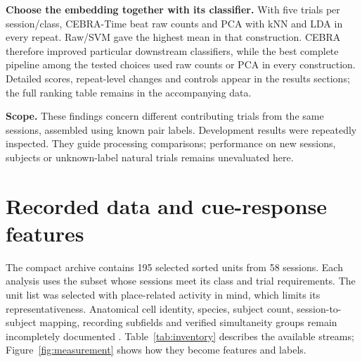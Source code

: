 \documentclass[10pt,a4paper]{article}
\newcommand{\key}[1]{\vspace{3pt}\noindent\colorbox{wash}{\parbox{\dimexpr\linewidth-2\fboxsep\relax}{\small #1}}\vspace{3pt}}
\begin{document}
\textbf{Choose the embedding together with its classifier.} With five trials per session/class, CEBRA-Time beat raw counts and PCA with kNN and LDA in every repeat. Raw/SVM gave the highest mean in that construction. CEBRA therefore improved particular downstream classifiers, while the best complete pipeline among the tested choices used raw counts or PCA in every construction. Detailed scores, repeat-level changes and controls appear in the results sections; the full ranking table remains in the accompanying data.

\key{\textbf{Scope.} These findings concern different contributing trials from the same sessions, assembled using known pair labels. Development results were repeatedly inspected. They guide processing comparisons; performance on new sessions, subjects or unknown-label natural trials remains unevaluated here.}

\clearpage
\section{Recorded data and cue-response features}
The compact archive contains 195 selected sorted units from 58 sessions. Each analysis uses the subset whose sessions meet its class and trial requirements. The unit list was selected with place-related activity in mind, which limits its representativeness. Anatomical cell identity, species, subject count, session-to-subject mapping, recording subfields and verified simultaneity groups remain incompletely documented \cite{data}. Table~\ref{tab:inventory} describes the available streams; Figure~\ref{fig:measurement} shows how they become features and labels.
\end{document}
